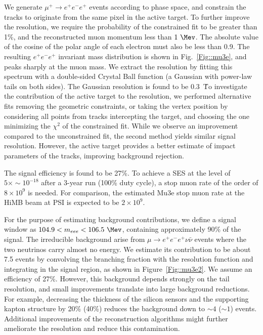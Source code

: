 We generate $\mu^+ \rightarrow e^+e^-e^+$ events according to phase space, and constrain the tracks to originate from the same pixel in the active target. To further improve the resolution, we require the probability of the constrained fit to be greater than 1\%, and the reconstructed muon momentum less than $1 ~\Mev$. The absolute value of the cosine of the polar angle of each electron must also be less than 0.9. The resulting $e^+e^-e^+$ invariant mass distribution is shown in Fig.~\ref{Fig::mu3e}, and peaks sharply at the muon mass. We extract the resolution by fitting this spectrum with a double-sided Crystal Ball function (a Gaussian with power-law tails on both sides). The Gaussian resolution is found to be 0.3~\Mev\. To investigate the contribution of the active target to the resolution, we performed alternative fits removing the geometric constraints, or taking the vertex position by considering all points from tracks intercepting the target, and choosing the one minimizing the $\chi^2$ of the constrained fit. While we observe an improvement compared to the unconstrained fit, the second method yields similar signal resolution. However, the active target provides a better estimate of impact parameters of the tracks, improving background rejection.

The signal efficiency is found to be 27\%. To achieve a SES at the level of $5\times\sim 10^{-18}$ after a 3-year run (100\% duty cycle), a stop muon rate of the order of $8\times 10^{9}$ is needed. For comparison, the estimated Mu3e stop muon rate at the HiMB beam at PSI is expected to be $2\times 10^{9}$.   

For the purpose of estimating background contributions, we define a signal window as $ 104.9 < m_{eee} < 106.5 ~\Mev$, containing approximately 90\% of the signal. The irreducible background arise from $\mu \rightarrow e^+e^-e^+ \nu\bar\nu$ events where the two neutrinos carry almost no energy. We estimate its contribution to be about 7.5 events by convolving the branching fraction with the resolution function and integrating in the signal region, as shown in Figure~\ref{Fig::mu3e2}. We assume an efficiency of 27\%. However, this background depends strongly on the tail resolution, and small improvements translate into large background reductions. For example, decreasing the thickness of the silicon sensors and the supporting kapton structure by 20\% (40\%) reduces the background down to $\sim 4$ ($\sim 1$) events. Additional improvements of the reconstruction algorithms might further ameliorate the resolution and reduce this contamination.

